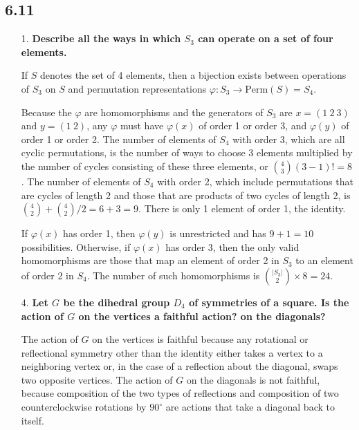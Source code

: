 \documentclass[a4paper,12pt]{article}
\begin{document}
\subsection*{6.11}
\begin{enumerate}
    \item[1.]
        \boldmath
        \textbf{Describe all the ways in which $S_3$ can operate on a set of four elements.} \par
        \unboldmath
        If $S$ denotes the set of 4 elements, then a bijection exists between operations of $S_3$ on $S$ and permutation representations $\varphi : S_3 \to \text{Perm}(S) = S_4$. \par
        Because the $\varphi$ are homomorphisms and the generators of $S_3$ are $x = (1\ 2\ 3)$ and $y = (1\ 2)$, any $\varphi$ must have $\varphi(x)$ of order 1 or order 3, and $\varphi(y)$ of order 1 or order 2. The number of elements of $S_4$ with order 3, which are all cyclic permutations, is the number of ways to choose 3 elements multiplied by the number of cycles consisting of these three elements, or $\binom{4}{3} (3 - 1)! = 8$. The number of elements of $S_4$ with order 2, which include permutations that are cycles of length 2 and those that are products of two cycles of length 2, is $\binom{4}{2} + \binom{4}{2}/2 = 6 + 3 = 9$. There is only 1 element of order 1, the identity. \par
        If $\varphi(x)$ has order 1, then $\varphi(y)$ is unrestricted and has $9 + 1 = 10$ possibilities. Otherwise, if $\varphi(x)$ has order 3, then the only valid homomorphisms are those that map an element of order 2 in $S_3$ to an element of order 2 in $S_4$. The number of such homomorphisms is $\binom{|S_3|}{2} \times 8 = 24$.

    \item[4.]
        \boldmath
        \textbf{Let $G$ be the dihedral group $D_4$ of symmetries of a square. Is the action of $G$ on the vertices a faithful action? on the diagonals?} \par
        \unboldmath
        The action of $G$ on the vertices is faithful because any rotational or reflectional symmetry other than the identity either takes a vertex to a neighboring vertex or, in the case of a reflection about the diagonal, swaps two opposite vertices. The action of $G$ on the diagonals is not faithful, because composition of the two types of reflections and composition of two counterclockwise rotations by $90^\circ$ are actions that take a diagonal back to itself.
\end{enumerate}
\end{document}
